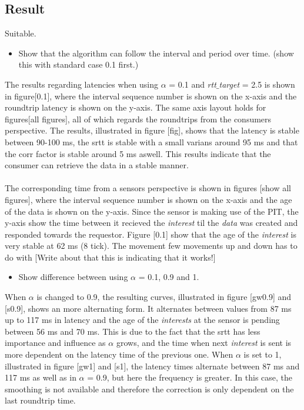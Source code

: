 \subsection{Result}
Suitable.

\begin{itemize}
\item Show that the algorithm can follow the interval and period over time. (show this with standard case 0.1 first.)\\
\end{itemize}
The results regarding latencies when using $\alpha$ = 0.1 and \textit{rtt$\_$target} = 2.5 is shown in figure[0.1], where the interval sequence number is shown on the x-axis and the roundtrip latency is shown on the y-axis. The same axis layout holds for figures[all figures], all of which regards the roundtrips from the consumers perspective. 
The results, illustrated in figure [fig], shows that the latency is stable between 90-100 ms, the srtt is stable with a small varians around 95 ms and that the corr factor is stable around 5 ms aswell. This results indicate that the consumer can retrieve the data in a stable manner.\\\\
The corresponding time from a sensors perspective is shown in figures [show all figures], where the interval sequence number is shown on the x-axis and the age of the data is shown on the y-axis. Since the sensor is making use of the PIT, the y-axis show the time between it recieved the \textit{interest} til the \textit{data} was created and responded towards the requestor. Figure [0.1] show that the age of the \textit{interest} is very stable at 62 ms (8 tick). The movement few movements up and down has to do with 
[Write about that this is indicating that it works!]


\begin{itemize}
\item Show difference between using $\alpha$ = 0.1, 0.9 and 1.
\end{itemize}
When $\alpha$ is changed to 0.9, the resulting curves, illustrated in figure [gw0.9] and [s0.9], shows an more alternating form. It alternates between values from 87 ms up to 117 ms in latency and the age of the \textit{interests} at the sensor is pending between 56 ms and 70 ms. This is due to the fact that the srtt has less importance and influence as $\alpha$ grows, and the time when next \textit{interest} is sent is more dependent on the latency time of the previous one. 
When $\alpha$ is set to 1, illustrated in figure [gw1] and [s1], the latency times alternate between 87 ms and 117 ms as well as in $\alpha$ = 0.9, but here the frequency is greater. In this case, the smoothing is not available and therefore the correction is only dependent on the last roundtrip time. 



